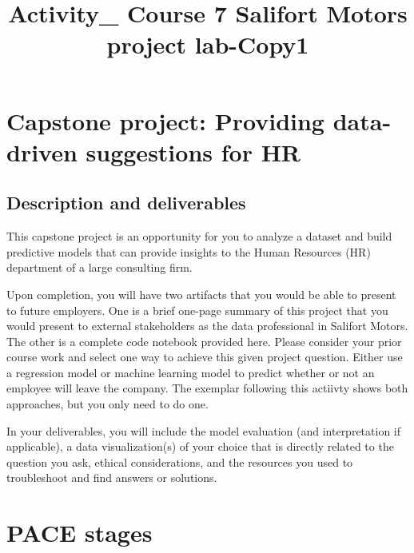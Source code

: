 \documentclass[11pt]{article}
\title{Activity\_ Course 7 Salifort Motors project lab-Copy1}
\begin{document}
    
    \maketitle
    
    

    
    \hypertarget{capstone-project-providing-data-driven-suggestions-for-hr}{%
\section{\texorpdfstring{\textbf{Capstone project: Providing data-driven
suggestions for
HR}}{Capstone project: Providing data-driven suggestions for HR}}\label{capstone-project-providing-data-driven-suggestions-for-hr}}

    \hypertarget{description-and-deliverables}{%
\subsection{Description and
deliverables}\label{description-and-deliverables}}

This capstone project is an opportunity for you to analyze a dataset and
build predictive models that can provide insights to the Human Resources
(HR) department of a large consulting firm.

Upon completion, you will have two artifacts that you would be able to
present to future employers. One is a brief one-page summary of this
project that you would present to external stakeholders as the data
professional in Salifort Motors. The other is a complete code notebook
provided here. Please consider your prior course work and select one way
to achieve this given project question. Either use a regression model or
machine learning model to predict whether or not an employee will leave
the company. The exemplar following this actiivty shows both approaches,
but you only need to do one.

In your deliverables, you will include the model evaluation (and
interpretation if applicable), a data visualization(s) of your choice
that is directly related to the question you ask, ethical
considerations, and the resources you used to troubleshoot and find
answers or solutions.

    \hypertarget{pace-stages}{%
\section{\texorpdfstring{\textbf{PACE
stages}}{PACE stages}}\label{pace-stages}}
\end{document}
